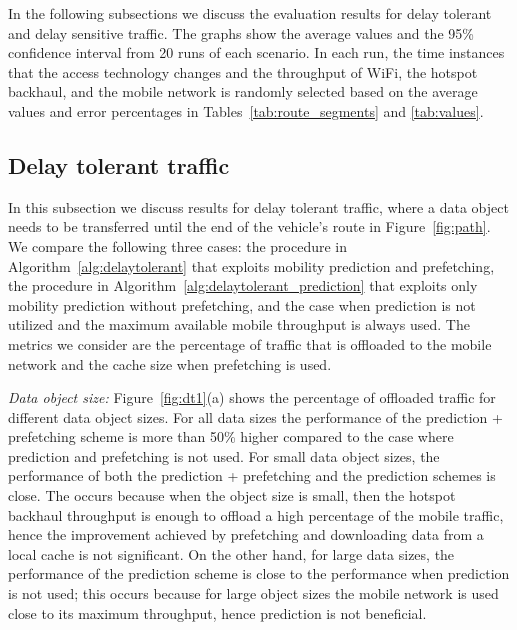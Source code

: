 \documentclass{sig-alternate}
\begin{document}
In the following subsections we discuss the evaluation results for delay tolerant and delay sensitive traffic. The graphs  show the average values and the 95\% confidence interval from 20 runs of each scenario.
In each run, the time instances that the access technology changes and the throughput of  WiFi, the hotspot backhaul, and the mobile network  is randomly selected based on the average values and error percentages in Tables~\ref{tab:route_segments} and \ref{tab:values}.

\subsection{Delay tolerant traffic}

In this subsection we discuss results for delay tolerant traffic, where a data object needs to be transferred until the  end of the vehicle's route in Figure~\ref{fig:path}. We compare the following three cases: the procedure in Algorithm~\ref{alg:delaytolerant} that exploits mobility prediction and prefetching, the procedure in Algorithm~\ref{alg:delaytolerant_prediction} that exploits only mobility prediction without prefetching, and the case when  prediction is not utilized and the  maximum available mobile throughput  is always used.
The metrics we consider are the percentage of traffic that is offloaded to the mobile network and the cache size when prefetching is used.


\medskip
\noindent
\emph{Data object size:} Figure~\ref{fig:dt1}(a) shows the percentage of offloaded traffic for different data object sizes. For all data sizes the performance of the prediction + prefetching scheme is more than 50\% higher compared to the case where  prediction and  prefetching is not used.
For small data object sizes, the performance of both the prediction + prefetching and the prediction schemes is close. The occurs because when the object size is small, then the hotspot backhaul throughput is enough to offload a  high percentage of the mobile traffic, hence the improvement achieved by prefetching and downloading data from a local cache is not significant. On the other hand, for large data sizes, the performance of the prediction scheme is close to the performance when prediction is not used; this occurs because for large object sizes the mobile network is used close to its maximum throughput, hence prediction is not beneficial.
\end{document}
